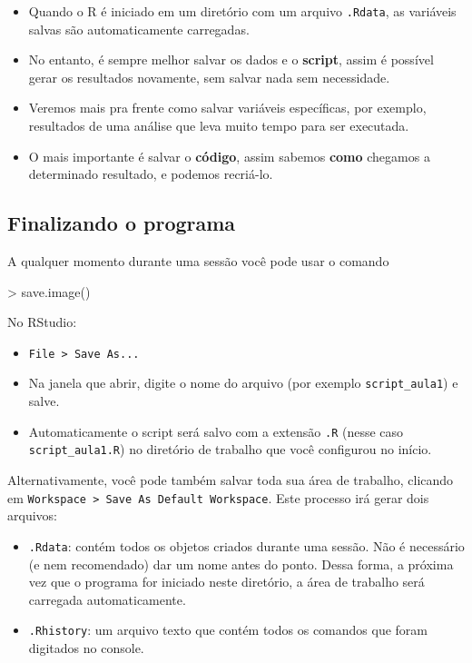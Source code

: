 \documentclass[
  10pt,
  a4paper]{book}
\newenvironment{Shaded}{\begin{snugshade}}{\end{snugshade}}
\newcommand{\FunctionTok}[1]{\textcolor[rgb]{0.00,0.00,0.00}{#1}}
\newcommand{\NormalTok}[1]{#1}
\newcommand{\SpecialCharTok}[1]{\textcolor[rgb]{0.00,0.00,0.00}{#1}}
\providecommand{\tightlist}{%
  \setlength{\itemsep}{0pt}\setlength{\parskip}{0pt}}
\begin{document}
\begin{itemize}
\tightlist
\item
  Quando o R é iniciado em um diretório com um arquivo \texttt{.Rdata}, as
  variáveis salvas são automaticamente carregadas.
\item
  No entanto, é sempre melhor salvar os dados e o \textbf{script}, assim é
  possível gerar os resultados novamente, sem salvar nada sem
  necessidade.
\item
  Veremos mais pra frente como salvar variáveis específicas, por
  exemplo, resultados de uma análise que leva muito tempo para ser
  executada.
\item
  O mais importante é salvar o \textbf{código}, assim sabemos \textbf{como}
  chegamos a determinado resultado, e podemos recriá-lo.
\end{itemize}

\hypertarget{finalizando-o-programa}{%
\subsection{Finalizando o programa}\label{finalizando-o-programa}}

A qualquer momento durante uma sessão você pode usar o comando

\begin{Shaded}
\begin{Highlighting}[]
\SpecialCharTok{\textgreater{}} \FunctionTok{save.image}\NormalTok{()}
\end{Highlighting}
\end{Shaded}

No RStudio:

\begin{itemize}
\tightlist
\item
  \texttt{File\ \textgreater{}\ Save\ As...}
\item
  Na janela que abrir, digite o nome do arquivo (por exemplo
  \texttt{script\_aula1}) e salve.
\item
  Automaticamente o script será salvo com a extensão \texttt{.R}
  (nesse caso \texttt{script\_aula1.R}) no diretório de trabalho que você
  configurou no início.
\end{itemize}

Alternativamente, você pode também salvar toda sua área de trabalho,
clicando em \texttt{Workspace\ \textgreater{}\ Save\ As\ Default\ Workspace}. Este
processo irá gerar dois arquivos:

\begin{itemize}
\tightlist
\item
  \texttt{.Rdata}: contém todos os objetos criados durante uma
  sessão. Não é necessário (e nem recomendado) dar um nome antes do
  ponto. Dessa forma, a próxima vez que o programa for iniciado neste
  diretório, a área de trabalho será carregada automaticamente.
\item
  \texttt{.Rhistory}: um arquivo texto que contém todos os comandos
  que foram digitados no console.
\end{itemize}
\end{document}
